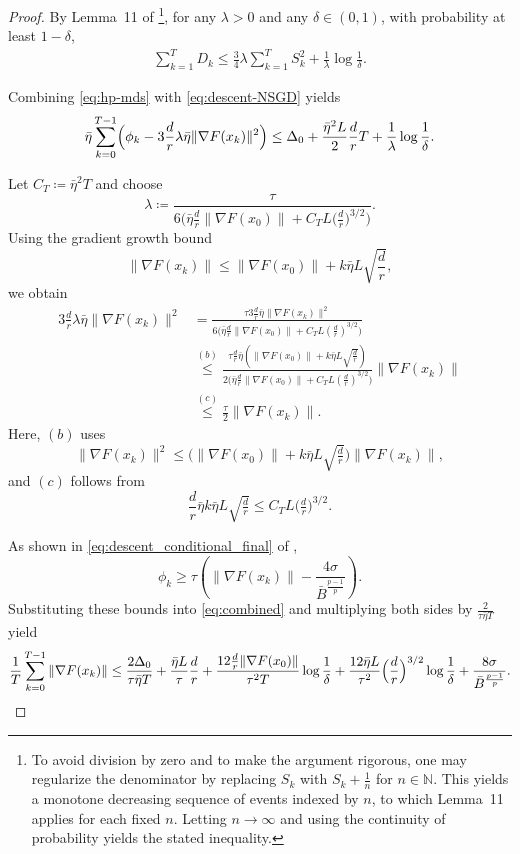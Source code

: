 \documentclass[10pt]{article}
\begin{document}
\begin{proof}
By Lemma~11 of \cite{huebler2025}\footnote{
To avoid division by zero and to make the argument rigorous,
one may regularize the denominator by replacing
$S_k$ with $S_k + \tfrac{1}{n}$ for $n\in\mathbb{N}$.
This yields a monotone decreasing sequence of events indexed by $n$,
to which Lemma~11 applies for each fixed $n$.
Letting $n\to\infty$ and using the continuity of probability
yields the stated inequality.
}, for any $\lambda>0$ and any $\delta\in(0,1)$,
with probability at least $1-\delta$,
\begin{align}
\sum_{k=1}^T D_k
\le
\frac{3}{4}\lambda\sum_{k=1}^T S_k^2
+
\frac{1}{\lambda}\log\frac{1}{\delta}.
\label{eq:hp-mds}
\end{align}

Combining \eqref{eq:hp-mds} with \eqref{eq:descent-NSGD} yields
\begin{align}
\bar{\eta}\sum_{k=0}^{T-1}
\Bigl(
\phi_k
-
3\frac{d}{r}\lambda\bar{\eta}\|\nabla F(x_k)\|^2
\Bigr)
\le
\Delta_0
+
\frac{\bar{\eta}^2L}{2}\frac{d}{r}T
+
\frac{1}{\lambda}\log\frac{1}{\delta}.
\label{eq:combined}
\end{align}

Let $C_T\coloneqq \bar{\eta}^2T$ and choose
\[
\lambda
\coloneqq
\frac{\tau}{
6\bigl(
\bar{\eta}\frac{d}{r}\|\nabla F(x_0)\|
+
C_TL\bigl(\tfrac{d}{r}\bigr)^{3/2}
\bigr)
}.
\]
Using the gradient growth bound
\[
\|\nabla F(x_k)\|
\le
\|\nabla F(x_0)\|
+
k\bar{\eta}L\sqrt{\frac{d}{r}},
\]
we obtain
\begin{align*}
3\frac{d}{r}\lambda\bar{\eta}\|\nabla F(x_k)\|^2
&=
\frac{\tau 3\frac{d}{r}\bar{\eta}\|\nabla F(x_k)\|^2}
{6\bigl(\bar{\eta}\frac{d}{r}\|\nabla F(x_0)\|
+ C_TL(\frac{d}{r})^{3/2}\bigr)} \\
&\overset{(b)}{\le}
\frac{\tau \frac{d}{r}\bar{\eta}
(\|\nabla F(x_0)\|+k\bar{\eta}L\sqrt{\frac{d}{r}})}
{2\bigl(\bar{\eta}\frac{d}{r}\|\nabla F(x_0)\|
+ C_TL(\frac{d}{r})^{3/2}\bigr)}
\|\nabla F(x_k)\| \\
&\overset{(c)}{\le}
\frac{\tau}{2}\|\nabla F(x_k)\|.
\end{align*}
Here, $(b)$ uses
\[
\|\nabla F(x_k)\|^2
\le
\bigl(\|\nabla F(x_0)\|
+
k\bar{\eta}L\sqrt{\tfrac{d}{r}}\bigr)
\|\nabla F(x_k)\|,
\]
and $(c)$ follows from
\[
\frac{d}{r}\bar{\eta}k\bar{\eta}L\sqrt{\tfrac{d}{r}}
\le
C_TL\bigl(\tfrac{d}{r}\bigr)^{3/2}.
\]


As shown in \eqref{eq:descent_conditional_final} of ,
\[
\phi_k
\ge
\tau\!\left(
\|\nabla F(x_k)\|
-
\frac{4\sigma}{\bar{B}^{\frac{p-1}{p}}}
\right).
\]
Substituting these bounds into \eqref{eq:combined} and multiplying both sides by
$\frac{2}{\tau\bar{\eta}T}$ yield
\begin{align*}
\frac{1}{T}\sum_{k=0}^{T-1}\|\nabla F(x_k)\|
\le
\frac{2\Delta_0}{\tau\bar{\eta}T}
+
\frac{\bar{\eta}L}{\tau}\frac{d}{r}
+
\frac{12\frac{d}{r}\|\nabla F(x_0)\|}{\tau^2T}\log\frac{1}{\delta}
+
\frac{12\bar{\eta}L}{\tau^2}
\Bigl(\frac{d}{r}\Bigr)^{3/2}
\log\frac{1}{\delta}
+
\frac{8\sigma}{\bar{B}^{\frac{p-1}{p}}}.
\end{align*}


\end{proof}
\end{document}
